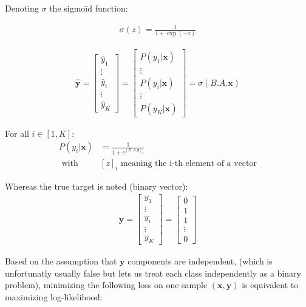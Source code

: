 Denoting $\sigma$ the sigmoïd function:

\begin{align}
	\sigma(z) = \frac{1}{1 + \exp(-z)}
\end{align}

\begin{align}
 \mathbf{\hat y}
 	= \begin{bmatrix} 
		\hat y_1 \\
		\vdots \\
		\hat y_i\\
		\vdots \\
		\hat y_K
	\end{bmatrix}
	 = \begin{bmatrix} 
		P(y_1 | \mathbf{x}) \\
		\vdots \\
		P(y_i | \mathbf{x})\\
		\vdots \\
		P(y_K | \mathbf{x})
	\end{bmatrix} = 
	\sigma(B.A.\mathbf{x})
\end{align}

For all $i \in [1, K]$: 
\begin{align}
	P(y_i | \mathbf{x}) &= \frac{1}{1 + e^{[B.A.\mathbf{x}]_i}}\\
		\text{      with } &[z]_i \text{ meaning the i-th element of a vector}
\end{align}

Whereas the true target is noted (binary vector):
\begin{align}
 \mathbf{y} = 
	\begin{bmatrix} 
		y_1 \\
		\vdots \\
		y_i \\
		\vdots \\
		y_K
	\end{bmatrix}
	= 
	\begin{bmatrix} 
		0 \\
		1 \\
		1 \\
		\vdots \\
		0
	\end{bmatrix}  
\end{align}

Based on the assumption that $\mathbf{y}$ components are independent, (which is unfortunatly usually false but lets us treat each class independently as a binary problem), minimizing the following loss on one sample $(\mathbf{x}, \mathbf{y})$ is equivalent to maximizing log-likelihood:

